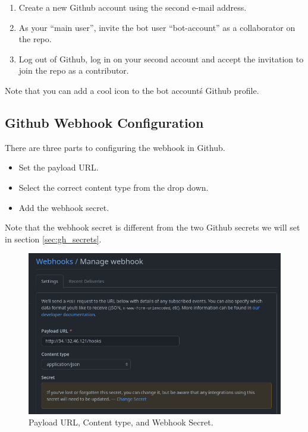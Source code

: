 \justifying
\begin{raggedright}
	\begin{enumerate}
		\item Create a new Github account using the second e-mail address.
		\item As your ``main user'', invite the bot user ``bot-account'' as a collaborator on the repo.
		\item Log out of Github, log in on your second account and accept the invitation to join the repo as a contributor.
	\end{enumerate}
\end{raggedright}
\vspace{2mm}

\justifying
Note that you can add a cool icon to the bot account\'s Github profile.


\subsection{\label{sec:webhook}Github Webhook Configuration}

\justifying
There are three parts to configuring the webhook in Github.

\justifying
\begin{raggedright}
	\begin{itemize}
		\item Set the payload URL.
		\item Select the correct content type from the drop down.
		\item Add the webhook secret.
	\end{itemize}
\end{raggedright}
\vspace{2mm}

\justifying
Note that the webhook secret is different from the two Github secrets we will set in section \ref{sec:gh_secrets}.

\begin{figure}[ht]
	\includegraphics[width=12cm]{../images/webhook1.png}
	\caption{Payload URL, Content type, and Webhook Secret.}
	\label{wh1}
\end{figure}
\vspace{2mm}


